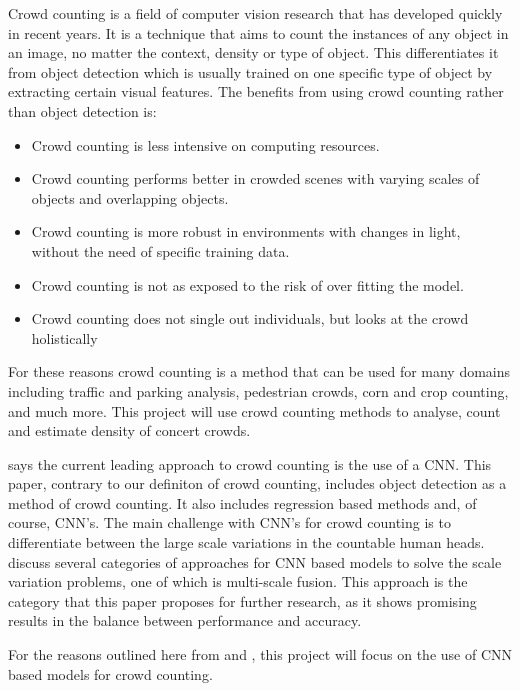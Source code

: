 \documentclass[
]{article}
\begin{document}
Crowd counting is a field of computer vision research that has developed
quickly in recent years. It is a technique that aims to count the
instances of any object in an image, no matter the context, density or
type of object. \autocite{sasnet} This differentiates it from object
detection which is usually trained on one specific type of object by
extracting certain visual features. The benefits from using crowd
counting rather than object detection is:

\begin{itemize}
\item
  Crowd counting is less intensive on computing resources.
\item
  Crowd counting performs better in crowded scenes with varying scales
  of objects and overlapping objects.
\item
  Crowd counting is more robust in environments with changes in light,
  without the need of specific training data.
\item
  Crowd counting is not as exposed to the risk of over fitting the
  model. \autocite{li2021approaches}
\item
  Crowd counting does not single out individuals, but looks at the crowd
  holistically \autocite{chan2008}
\end{itemize}

For these reasons crowd counting is a method that can be used for many
domains including traffic and parking analysis, pedestrian crowds, corn
and crop counting, and much more. This project will use crowd counting
methods to analyse, count and estimate density of concert crowds.

\autocite{li2021approaches} says the current leading approach to crowd
counting is the use of a CNN. This paper, contrary to our definiton of
crowd counting, includes object detection as a method of crowd counting.
It also includes regression based methods and, of course, CNN's. The
main challenge with CNN's for crowd counting is to differentiate between
the large scale variations in the countable human heads.
\autocite{li2021approaches} discuss several categories of approaches for
CNN based models to solve the scale variation problems, one of which is
multi-scale fusion. This approach is the category that this paper
proposes for further research, as it shows promising results in the
balance between performance and accuracy.

For the reasons outlined here from
\textcite{DBLP:journals/corr/OSheaN15} and \textcite{li2021approaches},
this project will focus on the use of CNN based models for crowd
counting.
\end{document}

